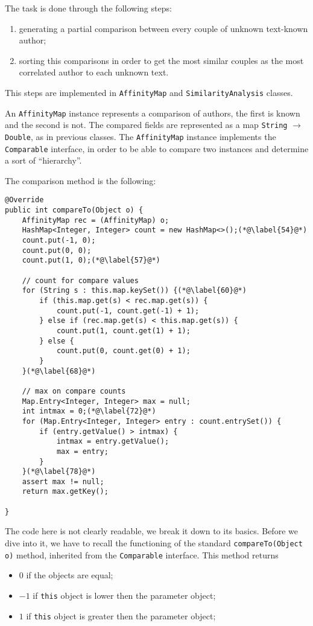 \documentclass[a4paper,11pt, twoside]{article}
\begin{document}
	The task is done through the following steps: \begin{enumerate}
		\item generating a partial comparison between every couple of unknown text-known author;
		\item sorting this comparisons in order to get the most similar couples as the most correlated author to each unknown text.
	\end{enumerate}

	This steps are implemented in \lstinline|AffinityMap| and \lstinline|SimilarityAnalysis| classes.
	
	 An \lstinline|AffinityMap| instance represents a comparison of authors, the first is known and the second is not. The compared fields are represented as a map \lstinline|String| $\to$ \lstinline|Double|, as in previous classes. The \lstinline|AffinityMap| instance implements the \lstinline|Comparable| interface, in order to be able to compare two instances and determine a sort of ``hierarchy''.
	 
	 The comparison method is the following:\begin{lstlisting}[firstnumber=51,caption={AffinityMap comparison method}, captionpos=b, label={lst:comparemethod}]
@Override
public int compareTo(Object o) {
	AffinityMap rec = (AffinityMap) o;
	HashMap<Integer, Integer> count = new HashMap<>();(*@\label{54}@*)
	count.put(-1, 0);
	count.put(0, 0);
	count.put(1, 0);(*@\label{57}@*)
	
	// count for compare values
	for (String s : this.map.keySet()) {(*@\label{60}@*)
		if (this.map.get(s) < rec.map.get(s)) {
			count.put(-1, count.get(-1) + 1);
		} else if (rec.map.get(s) < this.map.get(s)) {
			count.put(1, count.get(1) + 1);
		} else {
			count.put(0, count.get(0) + 1);
		}
	}(*@\label{68}@*)
	
	// max on compare counts
	Map.Entry<Integer, Integer> max = null;
	int intmax = 0;(*@\label{72}@*)
	for (Map.Entry<Integer, Integer> entry : count.entrySet()) {
		if (entry.getValue() > intmax) {
			intmax = entry.getValue();
			max = entry;
		}
	}(*@\label{78}@*)
	assert max != null;
	return max.getKey();

}
	 \end{lstlisting}
	 
	 The code here is not clearly readable, we break it down to its basics. Before we dive into it, we have to recall the functioning of the standard \lstinline|compareTo(Object o)| method, inherited from the \lstinline|Comparable| interface. This method returns \begin{itemize}
	 	\item $0$ if the objects are equal;
	 	\item $-1$ if \lstinline|this| object is lower then the parameter object;
	 	\item $1$ if \lstinline|this| object is greater then the parameter object;
	 \end{itemize}
 
\end{document}
